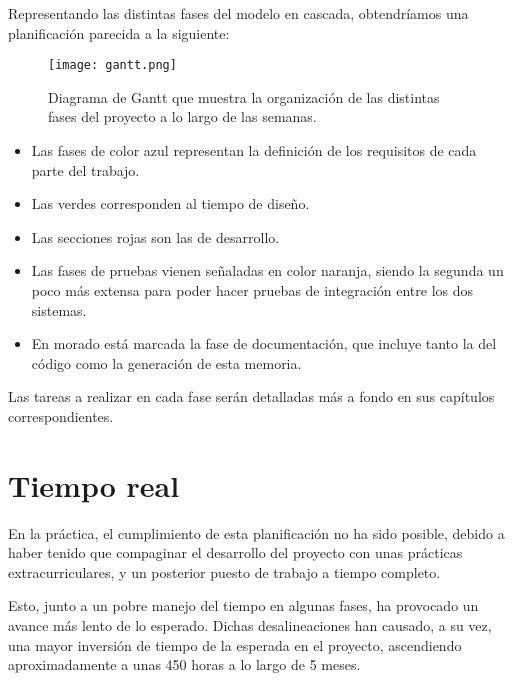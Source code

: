 Representando las distintas fases del modelo en cascada, obtendríamos una planificación parecida a la siguiente:

\begin{figure}[ht]
	\centering
	\texttt{[image: gantt.png]}
	\caption{Diagrama de Gantt que muestra la organización de las distintas fases del proyecto a lo largo de las semanas.}
\end{figure}

\begin{itemize}
    \item Las fases de color azul representan la definición de los requisitos de cada parte del trabajo.
    \item Las verdes corresponden al tiempo de diseño.
    \item Las secciones rojas son las de desarrollo.
    \item Las fases de pruebas vienen señaladas en color naranja, siendo la segunda un poco más extensa para poder hacer pruebas de integración entre los dos sistemas.
    \item En morado está marcada la fase de documentación, que incluye tanto la del código como la generación de esta memoria.
\end{itemize}

Las tareas a realizar en cada fase serán detalladas más a fondo en sus capítulos correspondientes.

\section{Tiempo real}
\label{sec:tiempo_real}

En la práctica, el cumplimiento de esta planificación no ha sido posible, debido a haber tenido que compaginar el desarrollo del proyecto con unas prácticas extracurriculares, y un posterior puesto de trabajo a tiempo completo.

Esto, junto a un pobre manejo del tiempo en algunas fases, ha provocado un avance más lento de lo esperado. Dichas desalineaciones han causado, a su vez, una mayor inversión de tiempo de la esperada en el proyecto, ascendiendo aproximadamente a unas 450 horas a lo largo de 5 meses.
